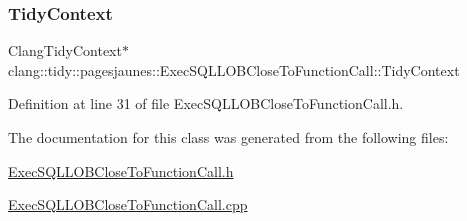 \subsubsection{\texorpdfstring{Tidy\+Context}{TidyContext}}
{\footnotesize\ttfamily Clang\+Tidy\+Context$\ast$ clang\+::tidy\+::pagesjaunes\+::\+Exec\+S\+Q\+L\+L\+O\+B\+Close\+To\+Function\+Call\+::\+Tidy\+Context}



Definition at line 31 of file Exec\+S\+Q\+L\+L\+O\+B\+Close\+To\+Function\+Call.\+h.



The documentation for this class was generated from the following files\+:\begin{DoxyCompactItemize}
\item 
\hyperlink{_exec_s_q_l_l_o_b_close_to_function_call_8h}{Exec\+S\+Q\+L\+L\+O\+B\+Close\+To\+Function\+Call.\+h}\item 
\hyperlink{_exec_s_q_l_l_o_b_close_to_function_call_8cpp}{Exec\+S\+Q\+L\+L\+O\+B\+Close\+To\+Function\+Call.\+cpp}\end{DoxyCompactItemize}
